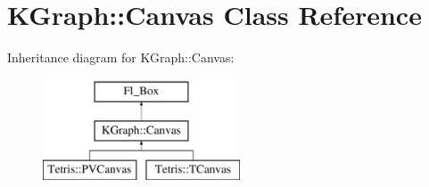\hypertarget{class_k_graph_1_1_canvas}{\section{K\-Graph\-:\-:Canvas Class Reference}
\label{class_k_graph_1_1_canvas}
}
Inheritance diagram for K\-Graph\-:\-:Canvas\-:\begin{figure}[H]
\begin{center}
\leavevmode
\includegraphics[height=3.000000cm]{class_k_graph_1_1_canvas}
\end{center}
\end{figure}

